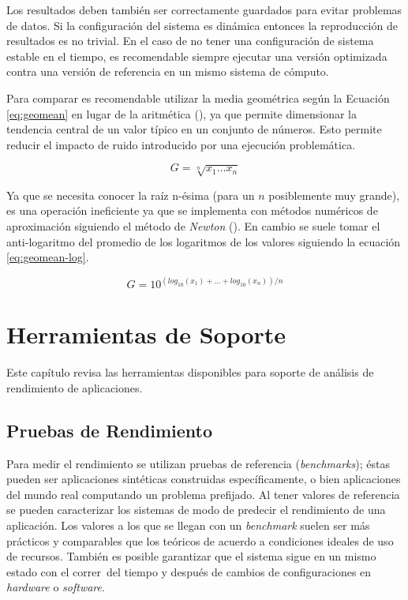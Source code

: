 \documentclass[a4paper]{report}
\begin{document}
Los resultados deben también ser correctamente guardados para evitar
problemas de datos. Si la configuración del sistema es dinámica entonces la
reproducción de resultados es no trivial. En el caso de no tener una
configuración de sistema estable en el tiempo, es recomendable siempre
ejecutar una versión optimizada contra una versión de referencia en un mismo
sistema de cómputo.

\bigskip

Para comparar es recomendable utilizar la media geométrica según la Ecuación \ref{eq:geomean} en lugar de la aritmética (\cite{geomean}), ya que permite dimensionar la tendencia central de un valor típico en un conjunto de números. Esto permite reducir el impacto de ruido introducido por una ejecución problemática.

\begin{equation}
\label{eq:geomean}
G = \sqrt[n]{x_{1} \ldots x_{n}}
\end{equation}

Ya que se necesita conocer la raíz n-ésima (para un $ n $ posiblemente muy grande), es una operación ineficiente ya que se implementa con métodos numéricos de aproximación
siguiendo el método de {\it Newton} (\cite{nroot}). En cambio se suele tomar el anti-logaritmo del promedio de los logaritmos de los valores siguiendo la ecuación \ref{eq:geomean-log}.

\begin{equation}
\label{eq:geomean-log}
G = 10 ^{( log _{10} (x_{1}) + \ldots + log _{10} (x_{n}) ) / n}
\end{equation}

\chapter{Herramientas de Soporte}\label{chapter:tools}

Este capítulo revisa las herramientas disponibles para soporte de análisis
de rendimiento de aplicaciones.

\section{Pruebas de Rendimiento}

Para medir el rendimiento se utilizan pruebas de referencia ({\em benchmarks}); éstas pueden ser aplicaciones sintéticas construidas específicamente, o bien aplicaciones del mundo real computando un problema prefijado. Al tener valores de referencia se pueden caracterizar los sistemas de modo de predecir el rendimiento de una aplicación.
Los valores a los que se llegan con un {\it benchmark} suelen ser más prácticos y
comparables que los teóricos de acuerdo a condiciones ideales de uso de recursos.
También es posible garantizar que el sistema sigue en un mismo estado con el correr\
del tiempo y después de cambios de configuraciones en {\it hardware} o {\it software}.
\end{document}
